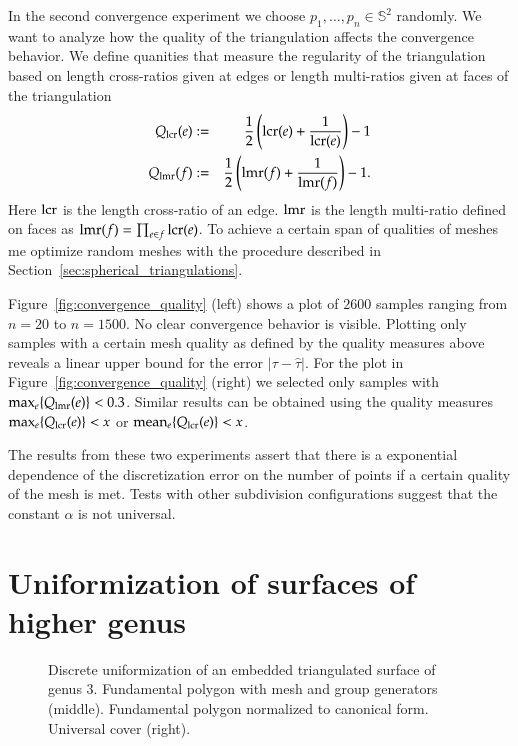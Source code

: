 \documentclass[Thesis]{subfiles}
\begin{document}
In the second convergence experiment we choose $p_1,\ldots,p_n\in \mathbb S^2$ randomly. 
We want to analyze how the quality of the triangulation affects the convergence behavior. 
We define quanities that measure the regularity of the triangulation based on length cross-ratios given at edges or length multi-ratios given at faces of the triangulation
\begin{eqnarray*}
	Q_{\operatorname{lcr}}(e) &:=& \frac{1}{2}\left(\operatorname{lcr}(e) + \frac{1}{\operatorname{lcr}(e)}\right) - 1\label{eq:quality_lcr}\\
	Q_{\operatorname{lmr}}(f) &:=& \frac{1}{2}\left(\operatorname{lmr}(f) + \frac{1}{\operatorname{lmr}(f)}\right) - 1\label{eq:quality_lmr}.
\end{eqnarray*}
Here $\operatorname{lcr}$ is the length cross-ratio of an edge. 
$\operatorname{lmr}$ is the length multi-ratio defined on faces as $\operatorname{lmr}(f)=\prod_{e \in f}\operatorname{lcr}(e)$.
To achieve a certain span of qualities of meshes me optimize random meshes with the procedure described in Section~\ref{sec:spherical_triangulations}.

Figure~\ref{fig:convergence_quality} (left) shows a plot of $2600$ samples ranging from $n=20$ to $n=1500$. 
No clear convergence behavior is visible. 
Plotting only samples with a certain mesh quality as defined by the quality measures above reveals a linear upper bound for the error $|\tau-\hat \tau|$. 
For the plot in Figure~\ref{fig:convergence_quality} (right) we selected only samples with $\max_e \{Q_{\operatorname{lmr}}(e)\} < 0.3$. 
Similar results can be obtained using the quality measures $\max_e \{Q_{\operatorname{lcr}}(e)\} < x$ or $\operatorname{mean}_e \{Q_{\operatorname{lcr}}(e)\} < x$.

The results from these two experiments assert that there is a exponential dependence of the discretization error on the number of points if a certain quality of the mesh is met. 
Tests with other subdivision configurations suggest that the constant $\alpha$ is not universal.

\section{Uniformization of surfaces of higher genus}
\label{sec:higher_genus}

\begin{figure}
\centering
{}
\caption{Discrete uniformization of an embedded triangulated surface of genus $3$. Fundamental polygon with mesh and group generators (middle). Fundamental polygon normalized to canonical form. Universal cover (right).}
\label{fig:embedded_genus_3}
\end{figure}
\end{document}
